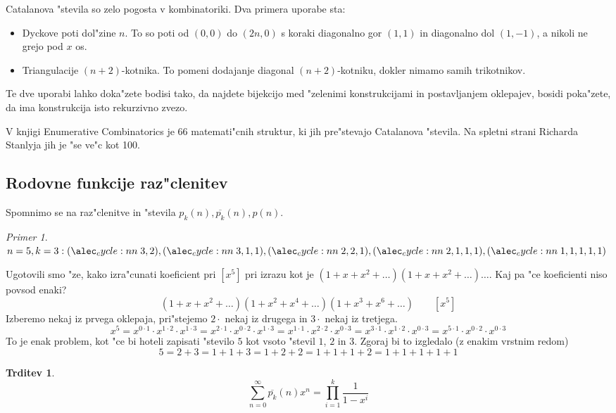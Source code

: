 \documentclass[a4paper,12pt]{article}
\theoremstyle{definition}
\newtheorem{claim}[counter]{Trditev}
\theoremstyle{remark}
\newtheorem*{ex}{Primer}
\begin{document}
Catalanova "stevila so zelo pogosta v kombinatoriki. Dva primera uporabe sta:
\begin{itemize}
	\item Dyckove poti dol"zine $n$. To so poti od $(0,0)$ do $(2n, 0)$ s koraki diagonalno gor $(1,1)$ in diagonalno dol $(1, -1)$, a nikoli ne grejo pod $x$ os.
	\item Triangulacije $(n + 2)$-kotnika. To pomeni dodajanje diagonal $(n+2)$-kotniku, dokler nimamo samih trikotnikov.
\end{itemize}
\label{TODO: add image 9}
Te dve uporabi lahko doka"zete bodisi tako, da najdete bijekcijo med "zelenimi konstrukcijami in postavljanjem oklepajev, bosidi poka"zete, da ima konstrukcija isto rekurzivno zvezo.

V knjigi Enumerative Combinatorics je 66 matemati"cnih struktur, ki jih pre"stevajo Catalanova "stevila. Na spletni strani Richarda Stanlyja jih je "se ve"c kot 100.

\subsection{Rodovne funkcije raz"clenitev}
Spomnimo se na raz"clenitve in "stevila $p_k(n), \overline{p_k}(n), p(n)$.
\begin{ex}
	$n = 5, k = 3: \cycle{3, 2}, \cycle{3, 1, 1}, \cycle{2, 2, 1}, \cycle{2, 1, 1, 1}, \cycle{1, 1, 1, 1, 1}$
\end{ex}

Ugotovili smo "ze, kako izra"cunati koeficient pri $[x^5]$ pri izrazu kot je $(1 + x + x^2 + \ldots)(1 + x + x^2 + \ldots)\ldots$. Kaj pa "ce koeficienti niso povsod enaki?
\[(1 + x + x^2 + \ldots)(1 + x^2 + x^4 + \ldots)(1 + x^3 + x^6 + \ldots) \qquad[x^5]\]
Izberemo nekaj iz prvega oklepaja, pri"stejemo $2\cdot$ nekaj iz drugega in $3 \cdot$ nekaj iz tretjega.
\[x^5 =
x^{0 \cdot 1} \cdot x^{1 \cdot 2} \cdot x^{1 \cdot 3} =
x^{2 \cdot 1} \cdot x^{0 \cdot 2} \cdot x^{1 \cdot 3} =
x^{1 \cdot 1} \cdot x^{2 \cdot 2} \cdot x^{0 \cdot 3} =
x^{3 \cdot 1} \cdot x^{1 \cdot 2} \cdot x^{0 \cdot 3} =
x^{5 \cdot 1} \cdot x^{0 \cdot 2} \cdot x^{0 \cdot 3}\]
To je enak problem, kot "ce bi hoteli zapisati "stevilo $5$ kot vsoto "stevil $1$, $2$ in $3$. Zgoraj bi to izgledalo (z enakim vrstnim redom)
\[5 = 2 + 3 = 1 + 1 + 3 = 1 + 2 + 2 = 1 + 1 + 1 + 2 = 1 + 1 + 1 + 1 + 1\]

\begin{claim}
	\[\sum_{n = 0}^{\infty} \overline{p_k} (n) x^n = \prod_{i = 1}^k \frac{1}{1 - x^i}\]
\end{claim}
\end{document}
